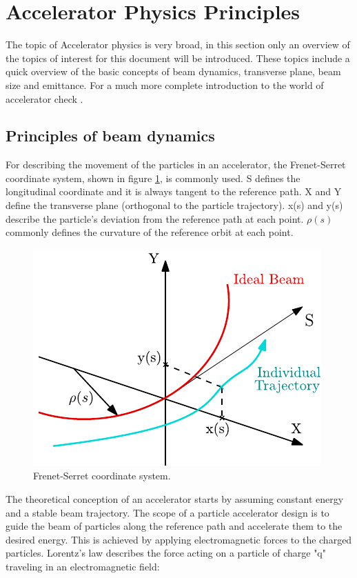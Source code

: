 \section{Accelerator Physics Principles}
\label{sec:AccPhysPrinc}

The topic of Accelerator physics is very broad, in this section only an overview of the topics of interest for this document will be introduced. These topics include a quick overview of the basic concepts of beam dynamics, transverse plane, beam size and emittance. For a much more complete introduction to the world of accelerator check \parencite*[][]{ref:BookAccPhysics}.

\subsection{Principles of beam dynamics}
\label{subsec:PrincBeamDyn}

For describing the movement of the particles in an accelerator, the Frenet-Serret coordinate system, shown in figure \ref{fig:CoordinateSystem}, is commonly used. S defines the longitudinal coordinate and it is always tangent to the reference path. X and Y define the transverse plane (orthogonal to the particle trajectory). x(s) and y(s) describe the particle's deviation from the reference path at each point. $\rho(s)$ commonly defines the curvature of the reference orbit at each point. 


\begin{figure}[h]
    \centering
    \includegraphics[width=0.5\columnwidth]{Figure_CoordinateSystem/CoordinateSystem.pdf}
    \caption{Frenet-Serret coordinate system.}
    \label{fig:CoordinateSystem}
\end{figure}

The theoretical conception of an accelerator starts by assuming constant energy and a stable beam trajectory. The scope of a particle accelerator design is to guide the beam of particles along the reference path and accelerate them to the desired energy. This is achieved by applying electromagnetic forces to the charged particles. Lorentz's law describes the force acting on a particle of charge "q" traveling in an electromagnetic field:

